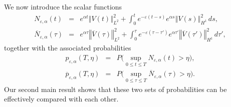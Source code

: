 \documentclass[10pt]{articleHJ}
\newcommand{\e}{\ensuremath{\varepsilon}}
\newcommand{\norm}[1]{\left\Vert#1\right\Vert}		%
\numberwithin{equation}{section}
\begin{document}
We now introduce the scalar functions
\begin{equation}
\label{eq:md:def:n}
\begin{array}{lcl}
N_{\e,\alpha}(t)
 & = &
e^{\alpha t}\norm{V(t)}_{L^2}^2
 + \int_0^t e^{- \e (t - s) }
      e^{\alpha s}\norm{  V(s)}_{H^1}^2 \, ds ,
\\[0.2cm]
%
\overline{N}_{\e,\alpha}(\tau)
& = &
e^{\alpha \tau}\norm{ \overline{V}(\tau)}_{L^2}^2
 + \int_0^\tau e^{- \e (\tau - \tau') }
    e^{\alpha \tau'} \norm{  \overline{V}(\tau')}_{H^1}^2 \, d\tau' ,
\end{array}
\end{equation}
together with the associated probabilities
\begin{equation}
\begin{array}{lcl}
p_{\e,\alpha}(T,\eta)
 &= & P\Big(
 \sup_{0 \le t \le T}  N_{\e,\alpha}(t)
 > \eta
\Big) ,
\\[0.2cm]
\overline{p}_{\e,\alpha}(T,\eta) & = & P\Big(
 \sup_{0 \le \tau \le T}  \overline{N}_{\e,\alpha}(\tau)
 > \eta
\Big) .
\end{array}
\end{equation}
Our second main result shows that
these two sets of probabilities
can be effectively compared with each other.
\end{document}
